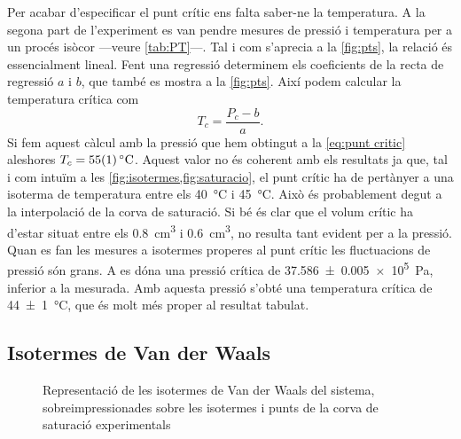 \documentclass[12pt]{article}
\numberwithin{table}{section}
\numberwithin{figure}{section}
\numberwithin{equation}{section}
\newcommand{\data}[3]{\SI{#1 \pm #2}{#3}}
\begin{document}
Per acabar d'especificar el punt crític ens falta saber-ne la temperatura. A la segona part de l'experiment es van pendre mesures de pressió i temperatura per a un procés isòcor ---veure \cref{tab:PT}---. Tal i com s'aprecia a la \cref{fig:pts}, la relació és essencialment lineal. Fent una regressió determinem els coeficients de la recta de regressió \( a \) i \( b \), que també es mostra a la \cref{fig:pts}. Així podem calcular la temperatura crítica com
\begin{equation*}
	T_c = \frac{P_c - b}{a}.
\end{equation*}
Si fem aquest càlcul amb la pressió que hem obtingut a la \cref{eq:punt critic} aleshores \( T_c = \data{55}{1}{\celsius} \). Aquest valor no és coherent amb els resultats ja que, tal i com intuïm a les \cref{fig:isotermes,fig:saturacio}, el punt crític ha de pertànyer a una isoterma de temperatura entre els \SI{40}{\celsius} i \SI{45}{\celsius}. Això és probablement degut a la interpolació de la corva de saturació. Si bé és clar que el volum crític ha d'estar situat entre els \SI{0.8}{cm^3} i \SI{0.6}{cm^3}, no resulta tant evident per a la pressió. Quan es fan les mesures a isotermes properes al punt crític les fluctuacions de pressió són grans. A \cite{nist} es dóna una pressió crítica de \data{37.586}{0.005e5}{Pa}, inferior a la mesurada. Amb aquesta pressió s'obté una temperatura crítica de \data{44}{1}{\celsius}, que és molt més proper al resultat tabulat.    

\subsection{Isotermes de Van der Waals}
\begin{figure}[htb]
	\small \sffamily \centering
	
	\caption{Representació de les isotermes de Van der Waals del sistema, sobreimpressionades sobre les isotermes i punts de la corva de saturació experimentals}
	\label{fig:vdw}
\end{figure}
\end{document}
